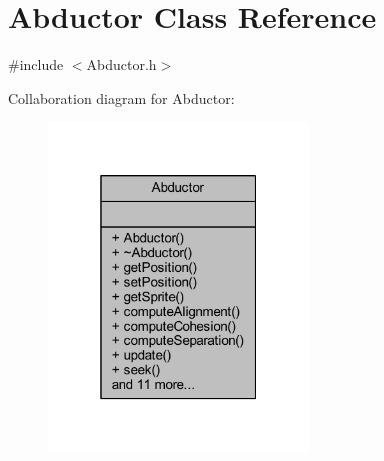 \hypertarget{class_abductor}{}\section{Abductor Class Reference}
\label{class_abductor}


{\ttfamily \#include $<$Abductor.\+h$>$}



Collaboration diagram for Abductor\+:
\nopagebreak
\begin{figure}[H]
\begin{center}
\leavevmode
\includegraphics[width=196pt]{class_abductor__coll__graph}
\end{center}
\end{figure}
